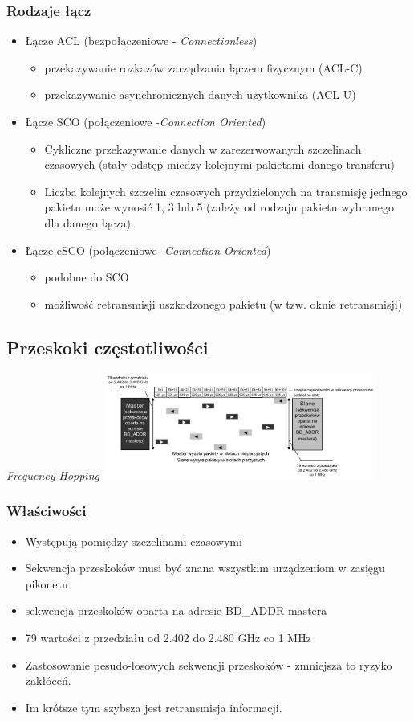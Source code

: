 \subsubsection{Rodzaje łącz}
\begin{itemize}
	\item Łącze ACL (bezpołączeniowe - \emph{Connectionless})
	\begin{itemize}
		\item przekazywanie rozkazów zarządzania łączem fizycznym (ACL-C)
		\item przekazywanie asynchronicznych danych użytkownika (ACL-U)
	\end{itemize}
	\item Łącze SCO (połączeniowe -\emph{Connection Oriented})
	\begin{itemize}
		\item Cykliczne przekazywanie danych w zarezerwowanych szczelinach czasowych (stały odstęp miedzy kolejnymi pakietami danego transferu)
		\item Liczba kolejnych szczelin czasowych przydzielonych na transmisję jednego pakietu może wynosić 1, 3 lub 5 (zależy od rodzaju pakietu wybranego dla danego łącza).
	\end{itemize}
	\item Łącze eSCO (połączeniowe -\emph{Connection Oriented})
	\begin{itemize}
			\item podobne do SCO
			\item możliwość retransmisji uszkodzonego pakietu (w tzw. oknie retransmisji)
	\end{itemize}
\end{itemize}

\subsection{Przeskoki częstotliwości}
\emph{Frequency Hopping}
\includegraphics[width=9cm]{./wyklady/Rysunek04.pdf}
\subsubsection{Właściwości}
\begin{itemize}
	\item Występują pomiędzy szczelinami czasowymi
	\item Sekwencja przeskoków musi być znana wszystkim urządzeniom w zasięgu pikonetu
	\item sekwencja przeskoków oparta na adresie BD\_ADDR mastera
	\item 79 wartości z przedziału od 2.402 do 2.480 GHz co 1 MHz
	\item Zastosowanie pesudo-losowych sekwencji przeskoków - zmniejsza to ryzyko zakłóceń.
	\item Im krótsze tym szybsza jest retransmisja informacji.
\end{itemize}
